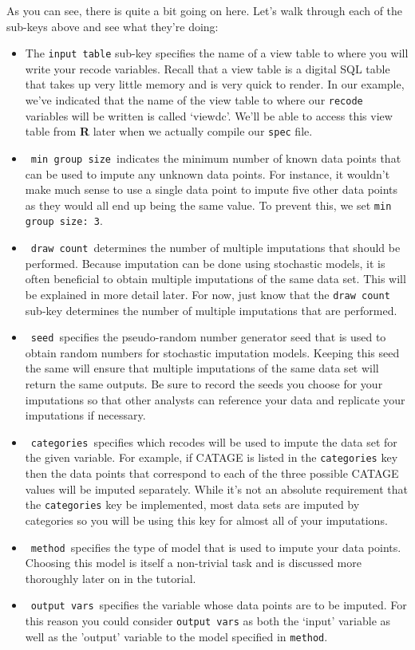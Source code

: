 \documentclass{article}
\begin{document}
As you can see, there is quite a bit going on here. Let's walk through each of the sub-keys 
above and see what they're doing:
\begin{itemize}
\item The {\tt input table} sub-key specifies the name of a view table to 
where you will write your recode variables. Recall that a view table is a digital SQL table 
that takes up very little memory and is very quick to render. In our example, we've indicated 
that the name of the view table to where our {\tt recode} variables will be written is 
called `viewdc'. We'll be able to access this view table from \textbf{R} later when we actually 
compile our {\tt spec} file.\\
\item \ {\tt min group size}\ indicates the minimum number of known data points that can be 
used to impute any unknown data points. For instance, it wouldn't make much sense to use a single 
data point to impute five other data points as they would all end up being the same value. To 
prevent this, we set {\tt min group size: 3}.\\
\item \ {\tt draw count}\ determines the number of multiple imputations that should be performed. 
Because imputation can be done using stochastic models, it is often beneficial to obtain multiple 
imputations of the same data set. This will be explained in more detail later. For now, just know 
that the {\tt draw count} sub-key determines the number of multiple imputations that are performed.\\
\item \ {\tt seed}\ specifies the pseudo-random number generator seed that is used to obtain 
random numbers for stochastic imputation models. Keeping this seed the same will ensure that multiple imputations of the same data set will return the same outputs. Be sure to record the seeds you choose for your 
imputations so that other analysts can reference your data and replicate your imputations if necessary.\\
\item \ {\tt categories}\  specifies which recodes will be used to impute the data set for 
the given variable. For example, if CATAGE is listed in the {\tt categories} key then the 
data points that correspond to each of the three possible CATAGE values will be imputed 
separately. While it's not an absolute requirement that the {\tt categories} key be implemented, most data 
sets are imputed by categories so you will be using this key for almost all of your imputations.\\
\item \ {\tt method}\ specifies the type of model that is used to impute your data points. 
Choosing this model is itself a non-trivial task and is discussed more thoroughly later on 
in the tutorial.\\
\item \ {\tt output vars}\ specifies the variable whose data points are to be imputed. For this reason 
you could consider {\tt output vars} as both the `input' variable as well as the 'output' variable 
to the model specified in {\tt method}.\\
\end{itemize}
\end{document}
